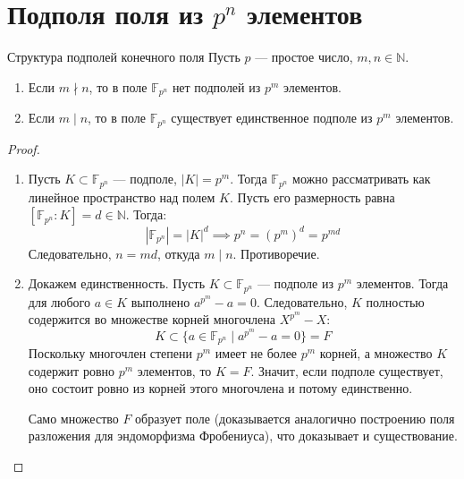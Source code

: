 
\section{Подполя поля из $p^n$ элементов}

\begin{Theorem}{Структура подполей конечного поля}{}
	Пусть $p$ --- простое число, $m, n \in \mathbb{N}$.
	\begin{enumerate}
		\item Если $m \nmid n$, то в поле $\mathbb{F}_{p^n}$ нет подполей из $p^m$ элементов.
		\item Если $m \mid n$, то в поле $\mathbb{F}_{p^n}$ существует единственное подполе из $p^m$ элементов.
	\end{enumerate}
\end{Theorem}

\begin{proof}
	\begin{enumerate}
		\item Пусть $K \subset \mathbb{F}_{p^n}$ --- подполе, $|K| = p^m$. Тогда $\mathbb{F}_{p^n}$ можно рассматривать как линейное пространство над полем $K$. Пусть его размерность равна $[\mathbb{F}_{p^n} : K] = d \in \mathbb{N}$. Тогда:
		\[ |\mathbb{F}_{p^n}| = |K|^d \implies p^n = (p^m)^d = p^{md} \]
		Следовательно, $n = md$, откуда $m \mid n$. Противоречие.

		\item Докажем единственность. Пусть $K \subset \mathbb{F}_{p^n}$ --- подполе из $p^m$ элементов. Тогда для любого $a \in K$ выполнено $a^{p^m} - a = 0$. Следовательно, $K$ полностью содержится во множестве корней многочлена $X^{p^m}-X$:
		\[ K \subset \{ a \in \mathbb{F}_{p^n} \mid a^{p^m} - a = 0 \} = F \]
		Поскольку многочлен степени $p^m$ имеет не более $p^m$ корней, а множество $K$ содержит ровно $p^m$ элементов, то $K = F$. Значит, если подполе существует, оно состоит ровно из корней этого многочлена и потому единственно.

		Само множество $F$ образует поле (доказывается аналогично построению поля разложения для эндоморфизма Фробениуса), что доказывает и существование.
	\end{enumerate}
\end{proof}

